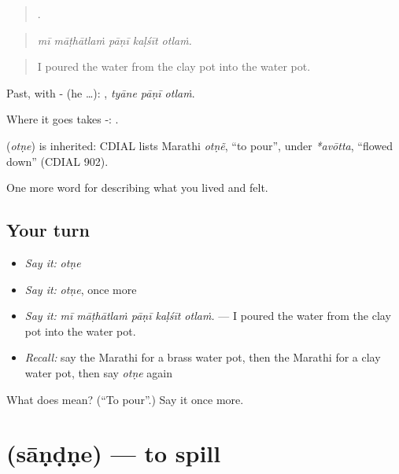 \begin{quote}
    .
\end{quote}

\begin{quote}
\emph{mī māṭhātlaṁ pāṇī kaḷśīt otlaṁ.}
\end{quote}

\begin{quote}
I poured the water from the clay pot into the water pot.
\end{quote}

Past, with - (he …):   , \emph{tyāne pāṇī otlaṁ}.

Where it goes takes -:  .

\begin{cousinweb}
\textbf{} (\emph{otṇe}) is inherited: CDIAL lists Marathi \emph{otṇẽ}, \textquotedblleft{}to pour\textquotedblright{}, under \emph{*avōtta}, \textquotedblleft{}flowed down\textquotedblright{} (CDIAL 902).
\end{cousinweb}

\begin{grammarlens}[title={What you've built}]
One more word for describing what you lived and felt.
\end{grammarlens}

\subsection*{Your turn}
\begin{itemize}
\raggedright
  \item \emph{Say it:} \emph{otṇe}
  \item \emph{Say it:} \emph{otṇe}, once more
  \item \emph{Say it:} \emph{mī māṭhātlaṁ pāṇī kaḷśīt otlaṁ.} — I poured the water from the clay pot into the water pot.
  \item \emph{Recall:} say the Marathi for a brass water pot, then the Marathi for a clay water pot, then say \emph{otṇe} again
\end{itemize}

\begin{tcolorbox}[breakable,colback=teal!4,colframe=teal!35!black,title={Before you move on}]
What does  mean? (\textquotedblleft{}To pour\textquotedblright{}.) Say it once more.
\end{tcolorbox}
\section[\texorpdfstring{\mr{सांडणे} (sāṇḍṇe)}{सांडणे (sāṇḍṇe)}]{ (sāṇḍṇe) — to spill}

